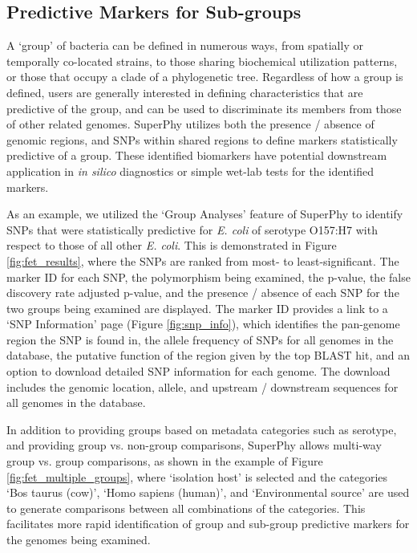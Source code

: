 \documentclass[doublespacing, linenumbers]{bmcart}
\begin{document}
\subsection{Predictive Markers for Sub-groups}
A `group' of bacteria can be defined in numerous ways, from spatially or temporally co-located strains, to those sharing biochemical utilization patterns, or those that occupy a clade of a phylogenetic tree. Regardless of how a group is defined, users are generally interested in defining characteristics that are predictive of the group, and can be used to discriminate its members from those of other related genomes. SuperPhy utilizes both the presence / absence of genomic regions, and SNPs within shared regions to define markers statistically predictive of a group. These identified biomarkers have potential downstream application in \textit{in silico} diagnostics or simple wet-lab tests for the identified markers.

As an example, we utilized the `Group Analyses' feature of SuperPhy to identify SNPs that were statistically predictive for \textit{E. coli} of serotype O157:H7 with respect to those of all other \textit{E. coli}. This is demonstrated in Figure \ref{fig:fet_results}, where the SNPs are ranked from most- to least-significant. The marker ID for each SNP, the polymorphism being examined, the p-value, the false discovery rate adjusted p-value, and the presence / absence of each SNP for the two groups being examined are displayed. The marker ID provides a link to a `SNP Information' page (Figure \ref{fig:snp_info}), which identifies the pan-genome region the SNP is found in, the allele frequency of SNPs for all genomes in the database, the putative function of the region given by the top BLAST hit, and an option to download detailed SNP information for each genome. The download includes the genomic location, allele, and upstream / downstream sequences for all genomes in the database. 

In addition to providing groups based on metadata categories such as serotype, and providing group vs. non-group comparisons, SuperPhy allows multi-way group vs. group comparisons, as shown in the example of Figure \ref{fig:fet_multiple_groups}, where `isolation host' is selected and the categories `Bos taurus (cow)', `Homo sapiens (human)', and `Environmental source' are used to generate comparisons between all combinations of the categories. This facilitates more rapid identification of group and sub-group predictive markers for the genomes being examined.
\end{document}
